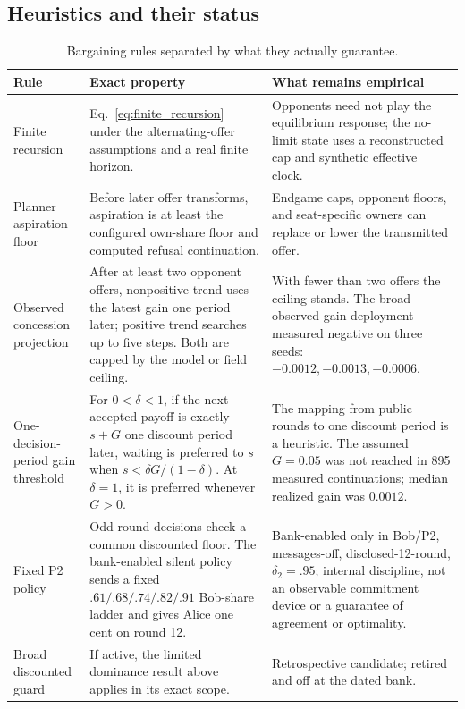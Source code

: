 \subsection{Heuristics and their status}

\begin{table}[h]
\centering
\small
\caption{Bargaining rules separated by what they actually guarantee.}
\label{tab:barg_heuristics}
\begin{tabularx}{\linewidth}{@{}p{3.1cm}p{5.0cm}Y@{}}
\toprule
Rule & Exact property & What remains empirical \\
\midrule
Finite recursion & Eq.~\eqref{eq:finite_recursion} under the alternating-offer assumptions and a real finite horizon. & Opponents need not play the equilibrium response; the no-limit state uses a reconstructed cap and synthetic effective clock. \\
Planner aspiration floor & Before later offer transforms, aspiration is at least the configured own-share floor and computed refusal continuation. & Endgame caps, opponent floors, and seat-specific owners can replace or lower the transmitted offer. \\
Observed concession projection & After at least two opponent offers, nonpositive trend uses the latest gain one period later; positive trend searches up to five steps. Both are capped by the model or field ceiling. & With fewer than two offers the ceiling stands. The broad observed-gain deployment measured negative on three seeds: $-0.0012,-0.0013,-0.0006$. \\
One-decision-period gain threshold & For $0<\delta<1$, if the next accepted payoff is exactly $s+G$ one discount period later, waiting is preferred to $s$ when $s<\delta G/(1-\delta)$. At $\delta=1$, it is preferred whenever $G>0$. & The mapping from public rounds to one discount period is a heuristic. The assumed $G=0.05$ was not reached in 895 measured continuations; median realized gain was $0.0012$. \\
Fixed P2 policy & Odd-round decisions check a common discounted floor. The bank-enabled silent policy sends a fixed $.61/.68/.74/.82/.91$ Bob-share ladder and gives Alice one cent on round 12. & Bank-enabled only in Bob/P2, messages-off, disclosed-12-round, $\delta_2=.95$; internal discipline, not an observable commitment device or a guarantee of agreement or optimality. \\
Broad discounted guard & If active, the limited dominance result above applies in its exact scope. & Retrospective candidate; retired and off at the dated bank. \\
\bottomrule
\end{tabularx}
\end{table}

